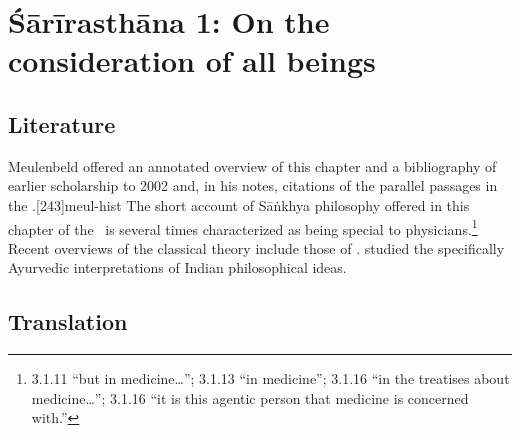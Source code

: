 
\chapter{Śārīrasthāna 1:  On the consideration of all beings}



\section{Literature} 

Meulenbeld offered an annotated overview of this chapter and a
bibliography of earlier scholarship to
2002 and, in his notes, citations of the parallel passages in the 
\CS.[243]{meul-hist}   The short account of Sāṅkhya philosophy 
offered in this chapter of the \SS\ is several times characterized as being special 
to physicians.\footnote{3.1.11  ``but in medicine\ldots''; 
3.1.13  ``in medicine''; 3.1.16  ``in the 
treatises about medicine\ldots ''; 3.1.16  ``it is this agentic person that medicine is 
concerned with.''} Recent overviews of the classical theory include those of 
\textcites{ruzs-2025}[ch.\,22]{adam-2022}[\S2.4]{chat-2021}.
\citet{comb-2011} studied the specifically Ayurvedic interpretations of Indian 
philosophical ideas.

\section{Translation}

